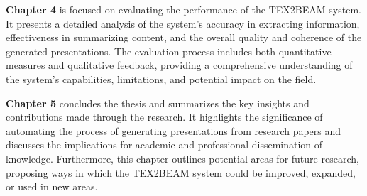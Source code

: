\textbf{Chapter 4} is focused on evaluating the performance of the TEX2BEAM system. It presents a detailed analysis of the system's accuracy in extracting information, effectiveness in summarizing content, and the overall quality and coherence of the generated presentations. The evaluation process includes both quantitative measures and qualitative feedback, providing a comprehensive understanding of the system's capabilities, limitations, and potential impact on the field.

\textbf{Chapter 5} concludes the thesis and summarizes the key insights and contributions made through the research. It highlights the significance of automating the process of generating presentations from research papers and discusses the implications for academic and professional dissemination of knowledge. Furthermore, this chapter outlines potential areas for future research, proposing ways in which the TEX2BEAM system could be improved, expanded, or used in new areas.
